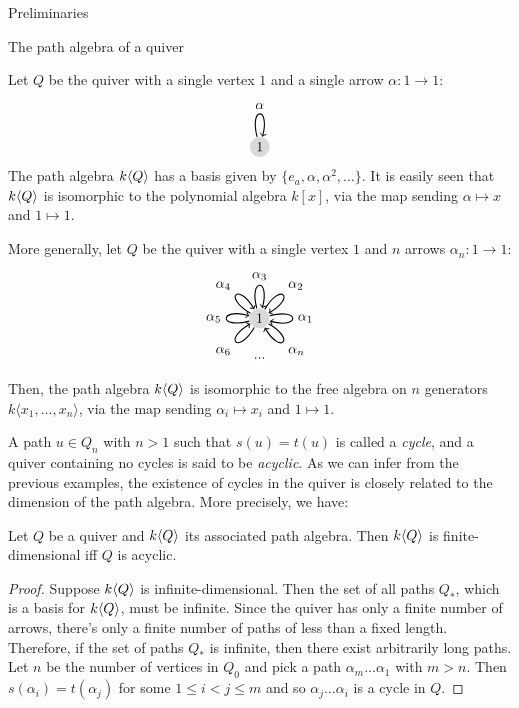 \begin{chapter}{Preliminaries}
\begin{section}{The path algebra of a quiver}
\begin{exmp}\label{one-loop} Let $Q$ be the quiver with a single vertex $1$ and a single arrow $\alpha:1\to 1$:
\[
\begin{tikzpicture}[->, thick]
\tikzset{every loop/.style={looseness=15}}
\node[circle, fill=gray!30, minimum size=.5cm, inner sep=.07cm]  (1) {1};
\path (1) edge [loop above] node {$\alpha$} (1);
\end{tikzpicture}
\]
The path algebra $k\langle Q\rangle$ has a basis given by $\{e_a, \alpha, \alpha^2, \dots\}$. It is easily seen that $k\langle Q\rangle$ is isomorphic to the polynomial algebra $k[x]$, via the map sending $\alpha \mapsto x$ and $1\mapsto 1$.
\end{exmp}
\begin{exmp}\label{several-loops} More generally, let $Q$ be the quiver with a single vertex $1$ and $n$ arrows $\alpha_n:1\to 1$:
\[
\begin{tikzpicture}[->, auto, thick]
\tikzset{every loop/.style={looseness=15}}
\node[circle, fill=gray!30, minimum size=.5cm, inner sep=.07cm]  (1) {1};
\node[circle, fill=white] (2) at +(270: 1) {...};
\path (1) edge [loop left] node {$\alpha_5$} (1);
\path (1) edge [loop above] node {$\alpha_3$} (1);
\path (1) edge [loop right] node {$\alpha_1$} (1);
\path (1) edge [in=30, out=60, loop] node {$\alpha_2$} (1);
\path (1) edge [in=210, out=240, loop] node {$\alpha_6$} (1);
\path (1) edge [in=120, out=150, loop] node {$\alpha_4$} (1);
\path (1) edge [in=300, out=330, loop] node {$\alpha_n$} (1);
\end{tikzpicture}
\]
Then, the path algebra $k\langle Q\rangle$ is isomorphic to the free algebra on $n$ generators $k\langle x_1,\dots, x_n\rangle$, via the map sending $\alpha_i\mapsto x_i$ and $1\mapsto 1$.
\end{exmp}

A path $u\in Q_n$ with $n>1$ such that $s(u)=t(u)$ is called a \emph{cycle}, and a quiver containing no cycles is said to be \emph{acyclic}. As we can infer from the previous examples, the existence of cycles in the quiver is closely related to the dimension of the path algebra. More precisely, we have:

\begin{prop}\label{acyclic-fin-dim}
Let $Q$ be a quiver and $k\langle Q\rangle$ its associated path algebra. Then $k\langle Q\rangle$ is finite-dimensional iff $Q$ is acyclic.
\end{prop}
\begin{proof} Suppose $k\langle Q\rangle$ is infinite-dimensional. Then the set of all paths $Q_*$, which is a basis for $k\langle Q\rangle$, must be infinite. Since the quiver has only a finite number of arrows, there's only a finite number of paths of less than a fixed length. Therefore, if the set of paths $Q_*$ is infinite, then there exist arbitrarily long paths. Let $n$ be the number of vertices in $Q_0$ and pick a path $\alpha_m\dots\alpha_1$ with $m>n$. Then $s(\alpha_i) = t(\alpha_j)$ for some $1\leq i < j\leq m$ and so $\alpha_j\dots\alpha_i$ is a cycle in $Q$.


\end{proof}
\end{section}
\end{chapter}
